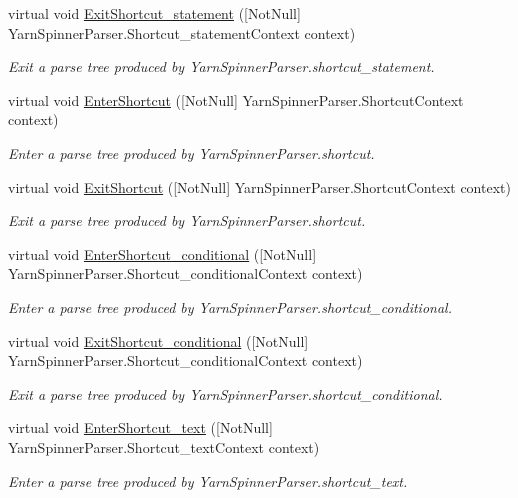 \begin{DoxyCompactItemize}
virtual void \hyperlink{a00190_aedbcd5225a20100938edb2b072515b2c}{Exit\-Shortcut\-\_\-statement} (\mbox{[}Not\-Null\mbox{]} Yarn\-Spinner\-Parser.\-Shortcut\-\_\-statement\-Context context)
\begin{DoxyCompactList}\small\item\em Exit a parse tree produced by Yarn\-Spinner\-Parser.\-shortcut\-\_\-statement. \end{DoxyCompactList}\item 
virtual void \hyperlink{a00190_ad110f7d08dcd1a8fd054ac34f5d42d7a}{Enter\-Shortcut} (\mbox{[}Not\-Null\mbox{]} Yarn\-Spinner\-Parser.\-Shortcut\-Context context)
\begin{DoxyCompactList}\small\item\em Enter a parse tree produced by Yarn\-Spinner\-Parser.\-shortcut. \end{DoxyCompactList}\item 
virtual void \hyperlink{a00190_a96270a7aa18e456051f1d17a0d391b87}{Exit\-Shortcut} (\mbox{[}Not\-Null\mbox{]} Yarn\-Spinner\-Parser.\-Shortcut\-Context context)
\begin{DoxyCompactList}\small\item\em Exit a parse tree produced by Yarn\-Spinner\-Parser.\-shortcut. \end{DoxyCompactList}\item 
virtual void \hyperlink{a00190_a476fa99e75445b668cc5bd7a5cf5e3e9}{Enter\-Shortcut\-\_\-conditional} (\mbox{[}Not\-Null\mbox{]} Yarn\-Spinner\-Parser.\-Shortcut\-\_\-conditional\-Context context)
\begin{DoxyCompactList}\small\item\em Enter a parse tree produced by Yarn\-Spinner\-Parser.\-shortcut\-\_\-conditional. \end{DoxyCompactList}\item 
virtual void \hyperlink{a00190_af600a0dc2204782118e7050560f37455}{Exit\-Shortcut\-\_\-conditional} (\mbox{[}Not\-Null\mbox{]} Yarn\-Spinner\-Parser.\-Shortcut\-\_\-conditional\-Context context)
\begin{DoxyCompactList}\small\item\em Exit a parse tree produced by Yarn\-Spinner\-Parser.\-shortcut\-\_\-conditional. \end{DoxyCompactList}\item 
virtual void \hyperlink{a00190_a4d7217dafbfae9f55eefe72a1a5e86f7}{Enter\-Shortcut\-\_\-text} (\mbox{[}Not\-Null\mbox{]} Yarn\-Spinner\-Parser.\-Shortcut\-\_\-text\-Context context)
\begin{DoxyCompactList}\small\item\em Enter a parse tree produced by Yarn\-Spinner\-Parser.\-shortcut\-\_\-text. \end{DoxyCompactList}\item 

\end{DoxyCompactItemize}
